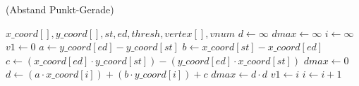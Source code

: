 \begin{algorithm}[ht]
\caption{ (Abstand Punkt-Gerade)}
\label{alg:getvertex-1}
\begin{algorithmic}[1]
	\Require $\mathit{x\_coord}[], \mathit{y\_coord}[], \mathit{st}, \mathit{ed}, \mathit{thresh}, \mathit{vertex}[], \mathit{vnum}$
	\State $d \gets \infty$
	\label{alg:getvertex-1-init-start}
	\State $\mathit{dmax} \gets \infty$
	\State $i \gets \infty$
	\State $\mathit{v1} \gets 0$
	\label{alg:getvertex-1-init-end}
	\State $a \gets \mathit{y\_coord}[ed] - \mathit{y\_coord}[st]$
	\label{alg:getvertex-1-line-start}
	\State $b \gets \mathit{x\_coord}[st] - \mathit{x\_coord}[ed]$
	\State $c \gets \left(\mathit{x\_coord}[ed] \cdot \mathit{y\_coord}[st]\right) - \left(\mathit{y\_coord}[ed] \cdot \mathit{x\_coord}[st]\right)$
	\label{alg:getvertex-1-line-end}
	\State $\mathit{dmax} \gets 0$
	\label{alg:getvertex-1-loop-start}
		\State $d \gets \left(a \cdot \mathit{x\_coord}[i]\right) + \left(b \cdot \mathit{y\_coord}[i]\right) + c$
			\State $\mathit{dmax} \gets d \cdot d$
			\label{alg:getvertex-1-savedmax}
			\State $\mathit{v1} \gets i$
		\EndIf
		\State $i \gets i + 1$
	\EndFor
	\label{alg:getvertex-1-loop-end}
\end{algorithmic}
\end{algorithm}
